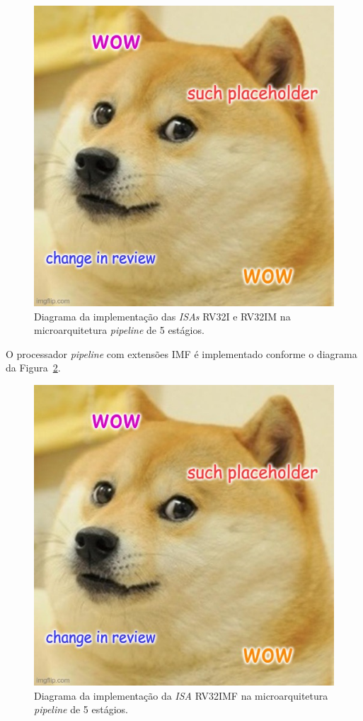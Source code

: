        \begin{figure}[H]
        \centering
            \includegraphics[width=.7\linewidth]{../images/placeholder.jpg}
            \caption{Diagrama da implementação das \textit{ISAs} RV32I e RV32IM na
            microarquitetura \textit{pipeline} de 5 estágios.}\label{fig:diagram_rv32i_pipe}
        \end{figure}

        { O processador \textit{pipeline} com extensões IMF é implementado conforme
            o diagrama da Figura~\ref{fig:diagram_rv32imf_pipe}.
        }

        \begin{figure}[H]
        \centering
            \includegraphics[width=.7\linewidth]{../images/placeholder.jpg}
            \caption{Diagrama da implementação da \textit{ISA} RV32IMF na
            microarquitetura \textit{pipeline} de 5 estágios.}\label{fig:diagram_rv32imf_pipe}
        \end{figure}

